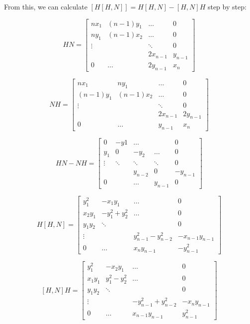 From this, we can calculate $[H[H,N]] = H[H,N]-[H,N]H$ step by step:

\[ 
HN = \begin{bmatrix}
        nx_1 & (n-1)y_1 & \hdots & 0 \\
        ny_1 & (n-1)x_2 & \hdots & 0 \\
        \vdots & & \ddots & 0\\
         &  & 2x_{n-1} & y_{n-1} \\
        0 & \hdots & 2y_{n-1} & x_n

    \end{bmatrix}
\]

\[ 
NH = \begin{bmatrix}
        nx_1 & ny_1 & \hdots & 0 \\
        (n-1)y_1 & (n-1)x_2 & \hdots & 0 \\
        \vdots & & \ddots & 0\\
         &  & 2x_{n-1} & 2y_{n-1} \\
        0 & \hdots & y_{n-1} & x_n

    \end{bmatrix}
\]

\[ 
HN-NH = \begin{bmatrix}
        0 & -y1 & \hdots &  & 0 \\
        y_1 & 0 & -y_2 & \hdots & 0 \\
        \vdots & \ddots & \ddots & \ddots & 0\\
         & & y_{n-2}& 0 & -y_{n-1} \\
        0 & & \hdots & y_{n-1} & 0

    \end{bmatrix}
\]

\[ 
H[H,N] = \begin{bmatrix}
        y_1^2 & -x_1y_1 & \hdots & 0 \\
        x_2y_1 & -y_1^2+y^2_2 &\hdots & 0 \\
        y_1y_2 & \ddots & & 0\\
        \vdots & & y^2_{n-1}-y^2_{n-2} & -x_{n-1}y_{n-1} \\
        0 & \hdots & x_ny_{n-1} & -y^2_{n-1}

    \end{bmatrix}
\]

\[ 
[H,N]H = \begin{bmatrix}
        y_1^2 & -x_2y_1 & \hdots & 0 \\
        x_1y_1 & y_1^2-y^2_2 &\hdots & 0 \\
        y_1y_2 & \ddots & & 0\\
        \vdots &  & -y^2_{n-1}+y^2_{n-2} & -x_{n}y_{n-1} \\
        0 & \hdots & x_{n-1}y_{n-1} & y^2_{n-1}

    \end{bmatrix}
\]
\\

